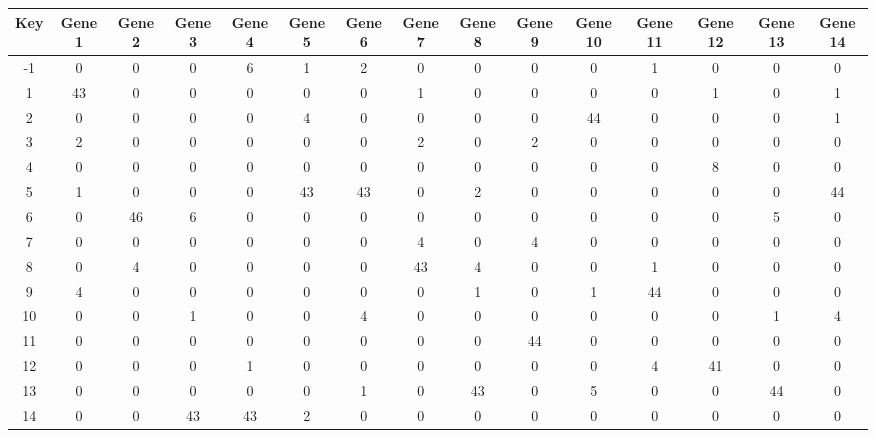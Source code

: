 \begin{tabular}{|c|c|c|c|c|c|c|c|c|c|c|c|c|c|c|}
\hline
Key & Gene 1 & Gene 2 & Gene 3 & Gene 4 & Gene 5 & Gene 6 & Gene 7 & Gene 8 & Gene 9 & Gene 10 & Gene 11 & Gene 12 & Gene 13 & Gene 14 \\
\hline
-1 & 0 & 0 & 0 & 6 & 1 & 2 & 0 & 0 & 0 & 0 & 1 & 0 & 0 & 0 \\
1 & 43 & 0 & 0 & 0 & 0 & 0 & 1 & 0 & 0 & 0 & 0 & 1 & 0 & 1 \\
2 & 0 & 0 & 0 & 0 & 4 & 0 & 0 & 0 & 0 & 44 & 0 & 0 & 0 & 1 \\
3 & 2 & 0 & 0 & 0 & 0 & 0 & 2 & 0 & 2 & 0 & 0 & 0 & 0 & 0 \\
4 & 0 & 0 & 0 & 0 & 0 & 0 & 0 & 0 & 0 & 0 & 0 & 8 & 0 & 0 \\
5 & 1 & 0 & 0 & 0 & 43 & 43 & 0 & 2 & 0 & 0 & 0 & 0 & 0 & 44 \\
6 & 0 & 46 & 6 & 0 & 0 & 0 & 0 & 0 & 0 & 0 & 0 & 0 & 5 & 0 \\
7 & 0 & 0 & 0 & 0 & 0 & 0 & 4 & 0 & 4 & 0 & 0 & 0 & 0 & 0 \\
8 & 0 & 4 & 0 & 0 & 0 & 0 & 43 & 4 & 0 & 0 & 1 & 0 & 0 & 0 \\
9 & 4 & 0 & 0 & 0 & 0 & 0 & 0 & 1 & 0 & 1 & 44 & 0 & 0 & 0 \\
10 & 0 & 0 & 1 & 0 & 0 & 4 & 0 & 0 & 0 & 0 & 0 & 0 & 1 & 4 \\
11 & 0 & 0 & 0 & 0 & 0 & 0 & 0 & 0 & 44 & 0 & 0 & 0 & 0 & 0 \\
12 & 0 & 0 & 0 & 1 & 0 & 0 & 0 & 0 & 0 & 0 & 4 & 41 & 0 & 0 \\
13 & 0 & 0 & 0 & 0 & 0 & 1 & 0 & 43 & 0 & 5 & 0 & 0 & 44 & 0 \\
14 & 0 & 0 & 43 & 43 & 2 & 0 & 0 & 0 & 0 & 0 & 0 & 0 & 0 & 0 \\
\hline
\end{tabular}